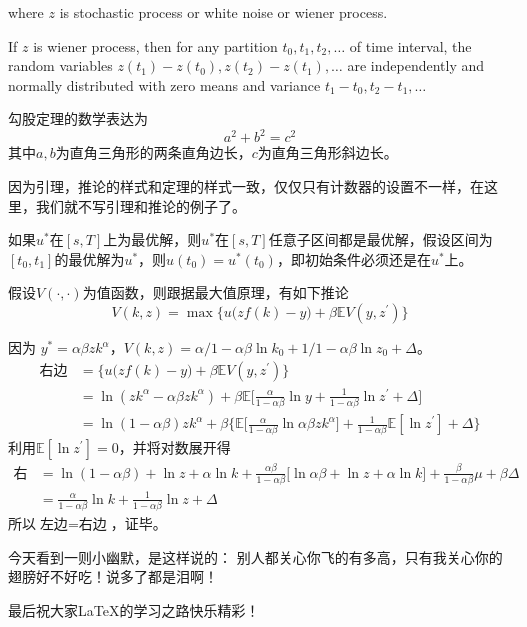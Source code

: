 \documentclass[cyan]{elegantnote}
\begin{document}
where $z$ is stochastic process or white noise or wiener process.

\begin{newdef}
If $z$ is wiener process, then for any partition $t_0,t_1,t_2,\ldots$ of time interval, the random variables $z(t_1)-z(t_0),z(t_2)-z(t_1),\ldots$ are independently and normally distributed with zero means and variance $t_1-t_0,t_2-t_1,\ldots$
\end{newdef}

\lipsum[1-2]

\begin{newthem}[勾股定理]
勾股定理的数学表达为
\[a^2+b^2=c^2\]
其中$a,b$为直角三角形的两条直角边长，$c$为直角三角形斜边长。
\end{newthem}

\begin{note}
因为引理，推论的样式和定理的样式一致，仅仅只有计数器的设置不一样，在这里，我们就不写引理和推论的例子了。
\end{note}


\lipsum[4]

\begin{newprop}[最优性原理]
如果$u^*$在$[s,T]$上为最优解，则$u^*$在$[s,T]$任意子区间都是最优解，假设区间为$[t_0,t_1]$的最优解为$u^*$，则$u(t_0)=u^{*}(t_0)$，即初始条件必须还是在$u^*$上。
\end{newprop}

\lipsum[5-6]
\begin{newcorol}
假设$V(\cdot,\cdot)$为值函数，则跟据最大值原理，有如下推论
\[
V(k,z)=\max\Big\{u\big(zf(k)-y\big)+\beta \mathbb{E}V(y,z^\prime)\Big\}
\]
\end{newcorol}

\begin{newproof}
因为 $y^*=\alpha\beta z k^\alpha$，$V(k,z)=\alpha/1-\alpha\beta\ln k_0+1/1-\alpha\beta \ln z_0+\Delta$。
\begin{align*}
\text{右边}&=\Big\{u\big(zf(k)-y\big)+\beta \mathbb{E}V(y,z^\prime)\Big\}\\
&=\ln(zk^\alpha-\alpha\beta zk^\alpha)+\beta\mathbb{E}\Big[\frac{\alpha}{1-\alpha\beta}\ln y+\frac{1}{1-\alpha\beta}\ln z^\prime+\Delta\Big]\\
&=\ln(1-\alpha\beta)zk^\alpha+\beta\Big\{\mathbb{E}\big[\frac{\alpha}{1-\alpha\beta}\ln \alpha\beta z k^\alpha\big]+\frac{1}{1-\alpha\beta}\mathbb{E}[\ln z^\prime]+\Delta\Big\}
\end{align*}
利用$\mathbb{E}[\ln z^\prime]=0$，并将对数展开得
\begin{align*}
\text{右边}&=\ln (1-\alpha\beta)+\ln z+\alpha\ln k+\frac{\alpha\beta}{1-\alpha\beta}\big[\ln \alpha\beta+\ln z+\alpha\ln k\big]+\frac{\beta}{1-\alpha\beta}\mu+\beta \Delta\\
&=\frac{\alpha}{1-\alpha\beta}\ln k+\frac{1}{1-\alpha\beta}\ln z+\Delta
\end{align*}
所以$\text{左边}=\text{右边}$，证毕。
\end{newproof}




\begin{conclusion}
今天看到一则小幽默，是这样说的：{\color{main} 别人都关心你飞的有多高，只有我关心你的翅膀好不好吃！}说多了都是泪啊！
\end{conclusion}

最后祝大家\LaTeX{}的学习之路快乐精彩！
\end{document}
